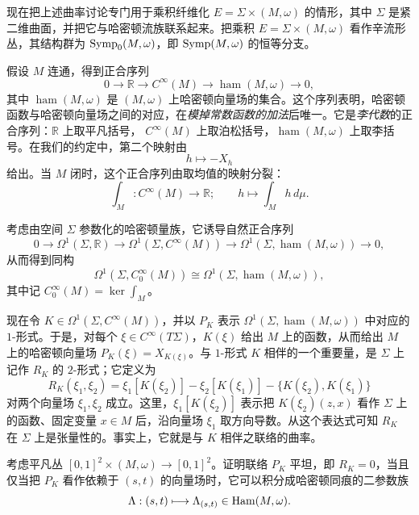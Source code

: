 现在把上述曲率讨论专门用于乘积纤维化
$E=\Sigma\times(M,\omega)$ 的情形，其中 $\Sigma$ 是紧二维曲面，并把它与哈密顿流族联系起来。把乘积 $E=\Sigma\times(M,\omega)$ 看作辛流形丛，其结构群为
$\operatorname{Symp}_0(M,\omega)$，即 $\operatorname{Symp}(M,\omega)$ 的恒等分支。

假设 $M$ 连通，得到正合序列
\begin{equation}
 0\longrightarrow\mathbb R\longrightarrow C^\infty(M)
 \longrightarrow\operatorname{ham}(M,\omega)\longrightarrow0,
 \label{eq:functions-hamiltonian-vector-fields}
\end{equation}
其中 $\operatorname{ham}(M,\omega)$ 是 $(M,\omega)$ 上哈密顿向量场的集合。这个序列表明，哈密顿函数与哈密顿向量场之间的对应，在\emph{模掉常数函数的加法}后唯一。它是\emph{李代数}的正合序列：$\mathbb R$ 上取平凡括号，
$C^\infty(M)$ 上取泊松括号，$\operatorname{ham}(M,\omega)$ 上取李括号。在我们的约定中，第二个映射由
\[
 h\longmapsto-X_h
\]
给出。当 $M$ 闭时，这个正合序列由取均值的映射分裂：
\[
 \int_M:C^\infty(M)\longrightarrow\mathbb R;\qquad
 h\longmapsto\int_M h\,d\mu.
\]

考虑由空间 $\Sigma$ 参数化的哈密顿量族，它诱导自然正合序列
\[
 0\longrightarrow\Omega^1(\Sigma,\mathbb R)
 \longrightarrow\Omega^1(\Sigma,C^\infty(M))
 \longrightarrow\Omega^1(\Sigma,\operatorname{ham}(M,\omega))
 \longrightarrow0,
\]
从而得到同构
\[
 \Omega^1(\Sigma,C_0^\infty(M))
 \cong\Omega^1(\Sigma,\operatorname{ham}(M,\omega)),
\]
其中记 $C_0^\infty(M)=\ker\int_M$。

现在令 $K\in\Omega^1(\Sigma,C^\infty(M))$，并以 $P_K$ 表示
$\Omega^1(\Sigma,\operatorname{ham}(M,\omega))$ 中对应的 $1$-形式。于是，对每个
$\xi\in C^\infty(T\Sigma)$，$K(\xi)$ 给出 $M$ 上的函数，从而给出 $M$ 上的哈密顿向量场
$P_K(\xi)=X_{K(\xi)}$。与 $1$-形式 $K$ 相伴的一个重要量，是
$\Sigma$ 上记作 $R_K$ 的 $2$-形式；它定义为
\begin{equation}
 R_K(\xi_1,\xi_2)
 =\xi_1[K(\xi_2)]-\xi_2[K(\xi_1)]
  -\{K(\xi_2),K(\xi_1)\}
 \label{eq:connection-curvature-rk}
\end{equation}
对两个向量场 $\xi_1,\xi_2$ 成立。这里，$\xi_1[K(\xi_2)]$ 表示把
$K(\xi_2)(z,x)$ 看作 $\Sigma$ 上的函数、固定变量 $x\in M$ 后，沿向量场
$\xi_1$ 取方向导数。从这个表达式可知 $R_K$ 在 $\Sigma$ 上是张量性的。事实上，它就是与 $K$ 相伴之联络的曲率。

\begin{exercise}[见 (Ba78)]\label{ex:flat-hamiltonian-connection}
考虑平凡丛 $[0,1]^2\times(M,\omega)\to[0,1]^2$。证明联络 $P_K$ 平坦，即
$R_K=0$，当且仅当把 $P_K$ 看作依赖于 $(s,t)$ 的向量场时，它可以积分成哈密顿同痕的二参数族
\[
 \Lambda:(s,t)\longmapsto\Lambda_{(s,t)}\in\operatorname{Ham}(M,\omega).
\]
\end{exercise}
